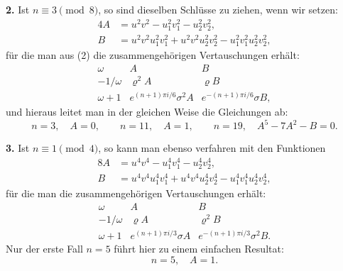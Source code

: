 \documentclass[11pt]{article}
\begin{document}
\noindent\textbf{2.} Ist $n\equiv3\pmod8$, so sind dieselben Schlüsse zu ziehen, wenn wir setzen:
\begin{equation}
\begin{aligned}
4A&=u^2v^2-u_1^2v_1^2-u_2^2v_2^2,\\
B&=u^2v^2u_1^2v_1^2+u^2v^2u_2^2v_2^2-u_1^2v_1^2u_2^2v_2^2,
\end{aligned}
\tag{11}
\end{equation}
für die man aus (2) die zusammengehörigen Vertauschungen erhält:
\begin{equation}
\begin{array}{c|cc}
\omega&A&B\\[0.2em]
-1/\omega&\varrho^2A&\varrho B\\[0.2em]
\omega+1&e^{(n+1)\pi i/6}\sigma^2A&e^{-(n+1)\pi i/6}\sigma B,
\end{array}
\tag{12}
\end{equation}
und hieraus leitet man in der gleichen Weise die Gleichungen ab:
\begin{equation}
 n=3,\quad A=0,\qquad n=11,\quad A=1,\qquad n=19,\quad A^5-7A^2-B=0.
\tag{13}
\end{equation}

\noindent\textbf{3.} Ist $n\equiv1\pmod4$, so kann man ebenso verfahren mit den Funktionen
\begin{equation}
\begin{aligned}
8A&=u^4v^4-u_1^4v_1^4-u_2^4v_2^4,\\
B&=u^4v^4u_1^4v_1^4+u^4v^4u_2^4v_2^4-u_1^4v_1^4u_2^4v_2^4,
\end{aligned}
\tag{14}
\end{equation}
für die man die zusammengehörigen Vertauschungen erhält:
\begin{equation}
\begin{array}{c|cc}
\omega&A&B\\[0.2em]
-1/\omega&\varrho A&\varrho^2B\\[0.2em]
\omega+1&e^{(n+1)\pi i/3}\sigma A&e^{-(n+1)\pi i/3}\sigma^2B.
\end{array}
\tag{15}
\end{equation}
Nur der erste Fall $n=5$ führt hier zu einem einfachen Resultat:
\begin{equation}
 n=5,\quad A=1.
\tag{16}
\end{equation}
\end{document}
